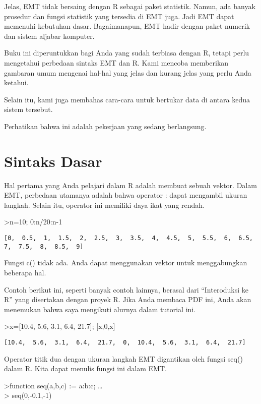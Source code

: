\documentclass[
]{book}
\begin{document}
Jelas, EMT tidak bersaing dengan R sebagai paket statistik. Namun, ada banyak prosedur dan fungsi statistik yang tersedia di EMT juga. Jadi EMT dapat memenuhi kebutuhan dasar. Bagaimanapun, EMT hadir dengan paket numerik dan sistem aljabar komputer.

Buku ini diperuntukkan bagi Anda yang sudah terbiasa dengan R, tetapi perlu mengetahui perbedaan sintaks EMT dan R. Kami mencoba memberikan gambaran umum mengenai hal-hal yang jelas dan kurang jelas yang perlu Anda ketahui.

Selain itu, kami juga membahas cara-cara untuk bertukar data di antara kedua sistem tersebut.

Perhatikan bahwa ini adalah pekerjaan yang sedang berlangsung.

\chapter{Sintaks Dasar}\label{sintaks-dasar}

Hal pertama yang Anda pelajari dalam R adalah membuat sebuah vektor. Dalam EMT, perbedaan utamanya adalah bahwa operator : dapat mengambil ukuran langkah. Selain itu, operator ini memiliki daya ikat yang rendah.

\textgreater n=10; 0:n/20:n-1

\begin{verbatim}
[0,  0.5,  1,  1.5,  2,  2.5,  3,  3.5,  4,  4.5,  5,  5.5,  6,  6.5,
7,  7.5,  8,  8.5,  9]
\end{verbatim}

Fungsi c() tidak ada. Anda dapat menggunakan vektor untuk menggabungkan beberapa hal.

Contoh berikut ini, seperti banyak contoh lainnya, berasal dari ``Interoduksi ke R'' yang disertakan dengan proyek R. Jika Anda membaca PDF ini, Anda akan menemukan bahwa saya mengikuti alurnya dalam tutorial ini.

\textgreater x={[}10.4, 5.6, 3.1, 6.4, 21.7{]}; {[}x,0,x{]}

\begin{verbatim}
[10.4,  5.6,  3.1,  6.4,  21.7,  0,  10.4,  5.6,  3.1,  6.4,  21.7]
\end{verbatim}

Operator titik dua dengan ukuran langkah EMT digantikan oleh fungsi seq() dalam R. Kita dapat menulis fungsi ini dalam EMT.

\textgreater function seq(a,b,c) := a:b:c; \ldots{}\\
\textgreater{} seq(0,-0.1,-1)
\end{document}
